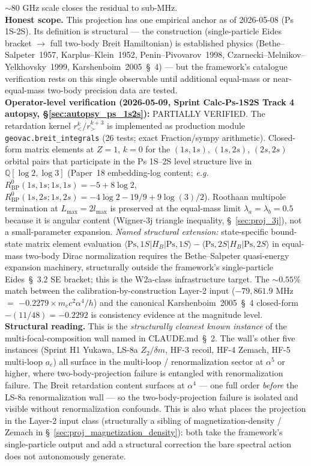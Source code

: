 \documentclass[11pt]{article}
\begin{document}
$\sim 80$ GHz scale closes the residual to sub-MHz.\\
\textbf{Honest scope.}  This projection has one empirical anchor as
of 2026-05-08 (Ps 1S-2S).  Its definition is structural --- the
construction (single-particle Eides bracket $\to$ full two-body
Breit Hamiltonian) is established physics (Bethe--Salpeter~1957,
Karplus--Klein~1952, Penin--Pivovarov~1998, Czarnecki--Melnikov--Yelkhovsky~1999,
Karshenboim~2005~\S~4) --- but the framework's catalogue
verification rests on this single observable until additional
equal-mass or near-equal-mass two-body precision data are tested.\\
\textbf{Operator-level verification (2026-05-09, Sprint Calc-Ps-1S2S
Track 4 autopsy, \S\ref{sec:autopsy_ps_1s2s}):} PARTIALLY VERIFIED.
The retardation kernel $r_<^k/r_>^{k+3}$ is implemented as production
module \texttt{geovac.breit\_integrals} (26 tests; exact
Fraction/sympy arithmetic).  Closed-form matrix elements at $Z=1$,
$k=0$ for the $(1s,1s)$, $(1s,2s)$, $(2s,2s)$ orbital pairs that
participate in the Ps 1S--2S level structure live in
$\mathbb{Q}[\log 2, \log 3]$ (Paper~18 embedding-log content;
\emph{e.g.\,} $R^0_\text{BP}(1s,1s;1s,1s) = -5 + 8\log 2$,
$R^0_\text{BP}(1s,2s;1s,2s) = -4\log 2 - 19/9 + 9\log(3)/2$).
Roothaan multipole termination at $L_\text{max} = 2 l_\text{max}$ is
preserved at the equal-mass limit $\lambda_a = \lambda_b = 0.5$
because it is angular content (Wigner-3j triangle inequality,
\S~\ref{sec:proj_3j}), not a small-parameter expansion.
\emph{Named structural extension:} state-specific bound-state matrix
element evaluation $\langle\text{Ps}, 1S | H_B | \text{Ps}, 1S\rangle
- \langle\text{Ps}, 2S | H_B | \text{Ps}, 2S\rangle$ in equal-mass
two-body Dirac normalization requires the Bethe--Salpeter quasi-energy
expansion machinery, structurally outside the framework's
single-particle Eides~\S~3.2 SE bracket; this is the W2a-class
infrastructure target.  The $\sim 0.55\%$ match between the
calibration-by-construction Layer-2 input ($-79{,}861.9$ MHz $=$
$-0.2279 \times m_e c^2 \alpha^4/h$) and the canonical
Karshenboim~2005~\S~4 closed-form $-(11/48) = -0.2292$ is consistency
evidence at the magnitude level.\\
\textbf{Structural reading.}  This is the \emph{structurally cleanest
known instance} of the multi-focal-composition wall named in
CLAUDE.md~\S~2.  The wall's other five instances (Sprint H1
Yukawa, LS-8a $Z_2/\delta m$, HF-3 recoil, HF-4 Zemach, HF-5
multi-loop $a_e$) all surface in the multi-loop / renormalization
sector at $\alpha^5$ or higher, where two-body-projection failure
is entangled with renormalization failure.  The Breit retardation
content surfaces at $\alpha^4$ --- one full order \emph{before}
the LS-8a renormalization wall --- so the two-body-projection
failure is isolated and visible without renormalization confounds.
This is also what places the projection in the Layer-2 input class
(structurally a sibling of magnetization-density / Zemach in
\S~\ref{sec:proj_magnetization_density}): both take the framework's
single-particle output and add a structural correction the bare
spectral action does not autonomously generate.
\end{document}
